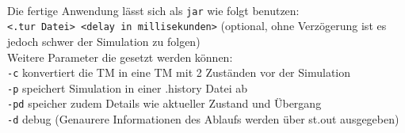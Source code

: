 \documentclass[10pt, a4paper]{article}
\newcommand{\ilc}{\texttt}
\begin{document}
\paragraph*{}
Die fertige Anwendung lässt sich als \ilc{jar} wie folgt benutzen:\\
\ilc{<.tur Datei> <delay in millisekunden>} (optional, ohne Verzögerung ist es jedoch schwer der Simulation zu folgen)\\
Weitere Parameter die gesetzt werden können:\\
\ilc{-c} konvertiert die TM in eine TM mit 2 Zuständen vor der Simulation\\
\ilc{-p} speichert Simulation in einer .history Datei ab\\
\ilc{-pd} speicher zudem Details wie aktueller Zustand und Übergang\\
\ilc{-d} debug (Genaurere Informationen des Ablaufs werden über st.out ausgegeben)
\end{document}
